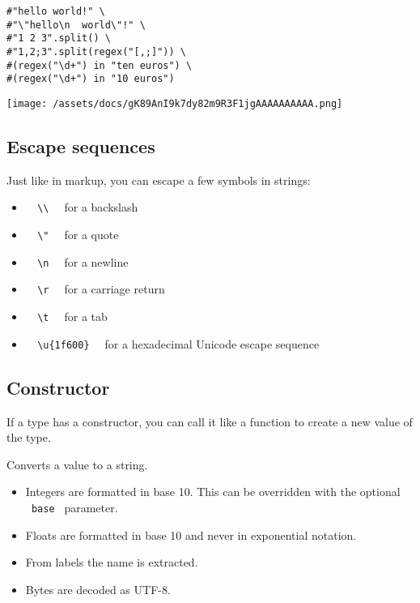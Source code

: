 \begin{verbatim}
#"hello world!" \
#"\"hello\n  world\"!" \
#"1 2 3".split() \
#"1,2;3".split(regex("[,;]")) \
#(regex("\d+") in "ten euros") \
#(regex("\d+") in "10 euros")
\end{verbatim}

\texttt{[image: /assets/docs/gK89AnI9k7dy82m9R3F1jgAAAAAAAAAA.png]}

\subsection{Escape sequences}\label{escapes}

Just like in markup, you can escape a few symbols in strings:

\begin{itemize}
\tightlist
\item
  \texttt{\ }{\texttt{\ \textbackslash{}\textbackslash{}\ }}\texttt{\ }
  for a backslash
\item
  \texttt{\ }{\texttt{\ \textbackslash{}"\ }}\texttt{\ } for a quote
\item
  \texttt{\ }{\texttt{\ \textbackslash{}n\ }}\texttt{\ } for a newline
\item
  \texttt{\ }{\texttt{\ \textbackslash{}r\ }}\texttt{\ } for a carriage
  return
\item
  \texttt{\ }{\texttt{\ \textbackslash{}t\ }}\texttt{\ } for a tab
\item
  \texttt{\ }{\texttt{\ \textbackslash{}u\{1f600\}\ }}\texttt{\ } for a
  hexadecimal Unicode escape sequence
\end{itemize}

\subsection{\texorpdfstring{Constructor
{}}{Constructor }}\label{constructor}

\label{constructor-constructor-tooltip}
If a type has a constructor, you can call it like a function to create a
new value of the type.

Converts a value to a string.

\begin{itemize}
\tightlist
\item
  Integers are formatted in base 10. This can be overridden with the
  optional \texttt{\ base\ } parameter.
\item
  Floats are formatted in base 10 and never in exponential notation.
\item
  From labels the name is extracted.
\item
  Bytes are decoded as UTF-8.
\end{itemize}

